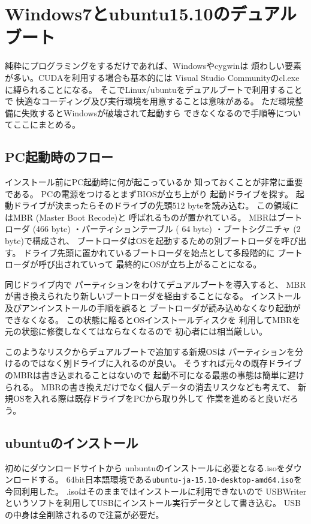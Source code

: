 
\chapter{Windows7とubuntu15.10のデュアルブート}
純粋にプログラミングをするだけであれば、Windowsやcygwinは
煩わしい要素が多い。CUDAを利用する場合も基本的には
Visual Studio Communityのcl.exeに縛られることになる。
そこでLinux/ubuntuをデュアルブートで利用することで
快適なコーディング及び実行環境を用意することは意味がある。
ただ環境整備に失敗するとWindowsが破壊されて起動すら
できなくなるので手順等についてここにまとめる。
\section{PC起動時のフロー}
インストール前にPC起動時に何が起こっているか
知っておくことが非常に重要である。
PCの電源をつけるとまずBIOSが立ち上がり
起動ドライブを探す。
起動ドライブが決まったらそのドライブの先頭512 byteを読み込む。
この領域にはMBR (Master Boot Recode)と
呼ばれるものが置かれている。
MBRはブートローダ (466 byte)
・パーティションテーブル ( 64 byte)
・ブートシグニチャ (2 byte)で構成され、
ブートローダはOSを起動するための別ブートローダを呼び出す。
ドライブ先頭に置かれているブートローダを始点として多段階的に
ブートローダが呼び出されていって
最終的にOSが立ち上がることになる。

同じドライブ内で
パーティションをわけてデュアルブートを導入すると、
MBRが書き換えられたり新しいブートローダを経由することになる。
インストール及びアンインストールの手順を誤ると
ブートローダが読み込めなくなり起動ができなくなる。
この状態に陥るとOSインストールディスクを
利用してMBRを元の状態に修復しなくてはならなくなるので
初心者には相当厳しい。

このようなリスクからデュアルブートで追加する新規OSは
パーティションを分けるのではなく別ドライブに入れるのが良い。
そうすれば元々の既存ドライブのMBRは書き込まれることはないので
起動不可になる最悪の事態は簡単に避けられる。
MBRの書き換えだけでなく個人データの消去リスクなども考えて、
新規OSを入れる際は既存ドライブをPCから取り外して
作業を進めると良いだろう。

\section{ubuntuのインストール}
初めにダウンロードサイト\cite{ubuntu_download}から
unbuntuのインストールに必要となる.isoをダウンロードする。
64bit日本語環境である\texttt{ubuntu-ja-15.10-desktop-amd64.iso}を今回利用した。
.isoはそのままではインストールに利用できないので
USBWriter\cite{USBWriter}というソフトを利用してUSBにインストール実行データとして書き込む。
USBの中身は全削除されるので注意が必要だ。

